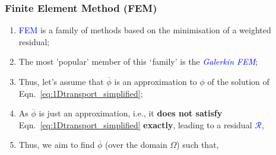 \documentclass[10pt,compress]{beamer}
\begin{document}
\begin{frame}
 \frametitle{Finite Element Method (FEM)} 

\begin{enumerate}
  \item <1-> \textcolor{blue}{FEM} is a family of methods based on the minimisation of a weighted residual;
  \item <2-> The most 'popular' member of this $\lq$family' is the \textcolor{blue}{\it Galerkin FEM};
  \item <3-> Thus, let's assume that $\overline{\phi}$ is an approximation to $\phi$ of the solution of Eqn.~\ref{eq:1Dtransport_simplified};
  \item <4-> As $\overline{\phi}$ is just an approximation, i.e., it {\bf does not satisfy} Eqn.~\ref{eq:1Dtransport_simplified} {\bf exactly}, leading to a residual \textcolor{blue}{$\mathcal{R}$},

  \item<5-> Thus, we aim to find $\overline{\phi}$ (over the domain $\Omega$) such that,

   
\end{enumerate}  
 
\end{frame}
\end{document}
